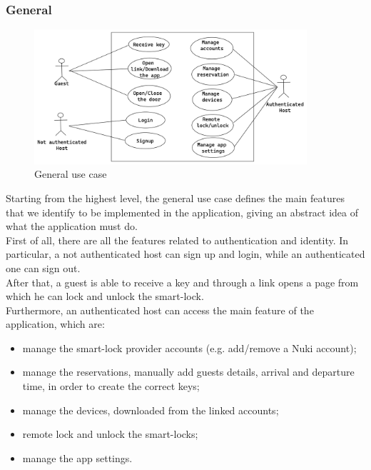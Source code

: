 \subsubsection{General}
\begin{figure}[H]
    \centering
    \includegraphics[width=0.9\textwidth]{figures/general.excalidraw.png}
    \caption{General use case}
    \label{fig:generalusecase}
\end{figure}
Starting from the highest level, the general use case defines the main features that we identify to be implemented in the application, giving an abstract idea of what the application must do. 
\\ First of all, there are all the features related to authentication and identity. In particular, a not authenticated host can sign up and login, while an authenticated one can sign out.
\\ After that, a guest is able to receive a key and through a link opens a page from which he can lock and unlock the smart-lock.
\\ Furthermore, an authenticated host can access the main feature of the application, which are:
\begin{itemize}
    \item manage the smart-lock provider accounts (e.g. add/remove a Nuki account);
    \item manage the reservations, manually add guests details, arrival and departure time, in order to create the correct keys;
    \item manage the devices, downloaded from the linked accounts;
    \item remote lock and unlock the smart-locks;
    \item manage the app settings.
\end{itemize}

